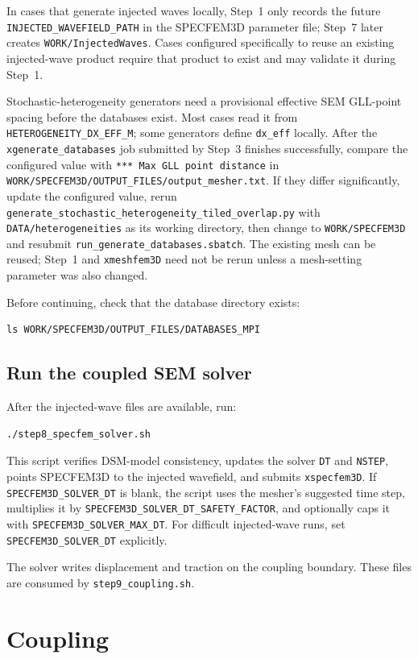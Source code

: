 \documentclass[11pt,oneside]{book}
\newcommand{\specfem}{SPECFEM3D}
\DeclareRobustCommand{\code}[1]{\nolinkurl{#1}}
\begin{document}
In cases that generate injected waves locally, Step~1 only records
the future \code{INJECTED_WAVEFIELD_PATH} in the SPECFEM3D parameter file;
Step~7 later creates \code{WORK/InjectedWaves}. Cases configured specifically
to reuse an existing injected-wave product require that product to exist and
may validate it during Step~1.

Stochastic-heterogeneity generators need a provisional effective SEM
GLL-point spacing before the databases exist. Most cases read it from
\code{HETEROGENEITY_DX_EFF_M}; some generators define \code{dx_eff} locally.
After the \code{xgenerate_databases} job submitted by Step~3 finishes
successfully, compare the configured value with
\code{*** Max GLL point distance} in
\code{WORK/SPECFEM3D/OUTPUT_FILES/output_mesher.txt}. If they differ
significantly, update the configured value, rerun
\code{generate_stochastic_heterogeneity_tiled_overlap.py} with
\code{DATA/heterogeneities} as its working directory, then change to
\code{WORK/SPECFEM3D} and resubmit
\code{run_generate_databases.sbatch}. The existing mesh can be reused; Step~1
and \code{xmeshfem3D} need not be rerun unless a mesh-setting parameter was
also changed.

Before continuing, check that the database directory exists:
\begin{lstlisting}
ls WORK/SPECFEM3D/OUTPUT_FILES/DATABASES_MPI
\end{lstlisting}

\section{Run the coupled SEM solver}

After the injected-wave files are available, run:
\begin{lstlisting}
./step8_specfem_solver.sh
\end{lstlisting}
This script verifies DSM-model consistency, updates the solver \code{DT} and
\code{NSTEP}, points \specfem{} to the injected wavefield, and submits
\code{xspecfem3D}. If \code{SPECFEM3D_SOLVER_DT} is blank, the script uses the
mesher's suggested time step, multiplies it by
\code{SPECFEM3D_SOLVER_DT_SAFETY_FACTOR}, and optionally caps it with
\code{SPECFEM3D_SOLVER_MAX_DT}. For difficult injected-wave runs, set
\code{SPECFEM3D_SOLVER_DT} explicitly.

The solver writes displacement and traction on the coupling boundary. These
files are consumed by \code{step9_coupling.sh}.

\chapter{Coupling}
\end{document}
